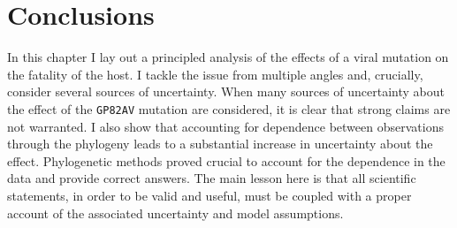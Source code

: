 \section{Conclusions}
\label{sec:conclusions}

In this chapter I lay out a principled analysis of the effects of a viral mutation on the fatality of the host.
I tackle the issue from multiple angles and, crucially, consider several sources of uncertainty.
When many sources of uncertainty about the effect of the \verb|GP82AV| mutation are considered, it is clear that strong claims are not warranted.
I also show that accounting for dependence between observations through the phylogeny leads to a substantial increase in uncertainty about the effect.
Phylogenetic methods proved crucial to account for the dependence in the data and provide correct answers.
The main lesson here is that all scientific statements, in order to be valid and useful, must be coupled with a proper account of the associated uncertainty and model assumptions.

% 